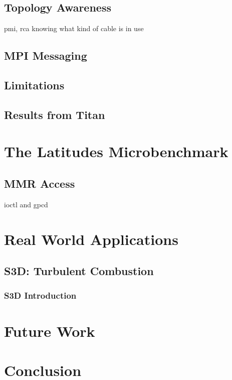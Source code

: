\documentclass[10pt, conference, compsocconf]{IEEEtran}
\begin{document}
\subsection{Topology Awareness}

pmi, rca knowing what kind of cable
is in use

\subsection{MPI Messaging}

\subsection{Limitations}

\subsection{Results from Titan}

\section{The Latitudes Microbenchmark}

\subsection{MMR Access}
ioctl and gpcd


\section{Real World Applications}

\subsection{S3D: Turbulent Combustion}

\subsubsection{S3D Introduction}



\section{Future Work}

\section{Conclusion}
\end{document}
